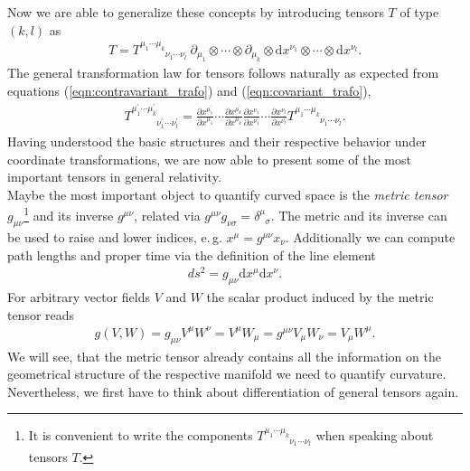 Now we are able to generalize these concepts by introducing tensors $T$ of type $(k,l)$ as
\begin{align}
T=T_{\phantom{\mu_{1} \cdots \mu_{k}}\nu_{1} \cdots \nu_{l}}^{\mu_{1} \cdots \mu_{k}} \ \partial_{\mu_{1}} \otimes \cdots \otimes \partial_{\mu_{k}} \otimes \mathrm{d} x^{\nu_{1}} \otimes \cdots \otimes \mathrm{d} x^{\nu_{l}}.
\end{align}
The general transformation law for tensors follows naturally as expected from equations (\ref{eqn:contravariant_trafo}) and (\ref{eqn:covariant_trafo}),
\begin{align}
	T_{\phantom{\mu_{1}^{\prime} \cdots \mu_{k}^{\prime}}\nu_{1}^{\prime} \cdots \nu_{l}^{\prime}}^{\mu_{1}^{\prime} \cdots \mu_{k}^{\prime}}=\frac{\partial x^{\mu_{1}^{\prime}}}{\partial x^{\mu_{1}}} \cdots \frac{\partial x^{\mu_{k}^{\prime}}}{\partial x^{\mu_{k}}} \frac{\partial x^{\nu_{1}}}{\partial x^{\nu_{1}^{\prime}}} \cdots \frac{\partial x^{\nu_{l}}}{\partial x^{\nu_{l}^{\prime}}} T^{\mu_{1} \cdots \mu_{k}}_{\phantom{\mu_{1} \cdots \mu_{k}}\nu_{1} \cdots \nu_{l}}.
\end{align}
Having understood the basic structures and their respective behavior under coordinate transformations, we are now able to present some of the most important tensors in general relativity. \\
Maybe the most important object to quantify curved space is the \textit{metric tensor} $g_{\mu\nu}$\footnote{It is convenient to write the components $T_{\phantom{\mu_{1} \cdots \mu_{k}}\nu_{1} \cdots \nu_{l}}^{\mu_{1} \cdots \mu_{k}}$ when speaking about tensors $T$.} and its inverse  $g^{\mu\nu}$, related via $g^{\mu\nu}g_{\nu\sigma} = \delta^{\mu}_{\phantom{\mu}\sigma}$. The metric and its inverse can be used to raise and lower indices, e.\,g. $x^{\mu} = g^{\mu\nu}x_{\nu}$. Additionally we can compute path lengths and proper time via the definition of the line element 
\begin{align}
	d s^{2}=g_{\mu \nu} \mathrm{d} x^{\mu} \mathrm{d} x^{\nu}.
\end{align}
For arbitrary vector fields $V$ and $W$ the scalar product induced by the metric tensor reads
\begin{align}
	g(V,W) = g_{\mu\nu}V^{\mu}W^{\nu} = V^{\mu}W_{\mu}= g^{\mu\nu}V_{\mu}W_{\nu} = V_{\mu}W^{\mu}.
\end{align}
We will see, that the metric tensor already contains all the information on the geometrical structure of the respective manifold we need to quantify curvature. Nevertheless, we first have to think about differentiation of general tensors again. \\
